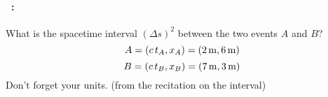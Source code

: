 \documentclass[12pt]{article} 
\begin{document}
\vfill

\paragraph{\problemname~\theproblem:}%
What is the spacetime interval $(\Delta s)^2$ between the two events $A$ and $B$?
$$A = (c\,t_A, x_A) = (2\,\mathrm{m}, 6\,\mathrm{m}) $$
$$B = (c\,t_B, x_B) = (7\,\mathrm{m}, 3\,\mathrm{m}) $$
Don't forget your units. (from the recitation on the interval)

\vfill
~
\end{document}
